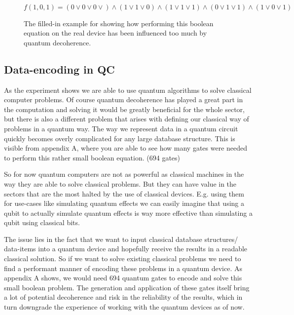 \begin{figure}
	\centering
	$f(1,0,1) = (0 \vee 0 \vee 0 \vee) \wedge (1 \vee 1 \vee 0)  \wedge ( 1 \vee 1 \vee  1) \wedge ( 0 \vee 1 \vee 1) \wedge  ( 1 \vee 0 \vee  1)$
	\caption{The filled-in example for showing how performing this boolean equation on the real device has been influenced too much by quantum decoherence.}
\end{figure}



\subsection{Data-encoding in QC}

As the experiment shows we are able to use quantum algorithms to solve classical computer problems. Of course quantum decoherence has played a great part in the computation and solving it would be greatly beneficial for the whole sector, but there is also a different problem that arises with defining our classical way of problems in a quantum way. The way we represent data in a quantum circuit quickly becomes overly complicated for any large database structure. This is visible from appendix A, where you are able to see how many gates were needed to perform this rather small boolean equation. (694 gates)

So for now quantum computers are not as powerful as classical machines in the way they are able to solve classical problems. But they can have value in the sectors that are the most halted by the use of classical devices. E.g. using them for use-cases like simulating quantum effects we can easily imagine that using a qubit to actually simulate quantum effects is way more effective than simulating a qubit using classical bits.

The issue lies in the fact that we want to input classical database structures/ data-items into a quantum device and hopefully receive the results in a readable classical solution. So if we want to solve existing classical problems we need to find a performant manner of encoding these problems in a quantum device. As appendix A shows, we would need 694 quantum gates to encode and solve this small boolean problem. The generation and application of these gates itself bring a lot of potential decoherence and risk in the reliability of the results, which in turn downgrade the experience of working with the quantum devices as of now.

